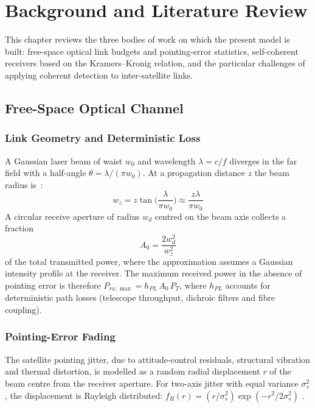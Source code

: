 \chapter{Background and Literature Review}

This chapter reviews the three bodies of work on which the present model is built: free-space optical link budgets and pointing-error statistics, self-coherent receivers based on the Kramers--Kronig relation, and the particular challenges of applying coherent detection to inter-satellite links.

\section{Free-Space Optical Channel}

\subsection{Link Geometry and Deterministic Loss}

A Gaussian laser beam of waist $w_0$ and wavelength $\lambda=c/f$ diverges in the far field with a half-angle $\theta=\lambda/(\pi w_0)$. At a propagation distance $z$ the beam radius is~\cite{kaushal2017}:
\begin{equation}
w_z=z\tan\!\Big(\frac{\lambda}{\pi w_0}\Big)\approx\frac{z\lambda}{\pi w_0}
\end{equation}
A circular receive aperture of radius $w_d$ centred on the beam axis collects a fraction
\begin{equation}
A_0=\frac{2w_d^2}{w_z^2}
\end{equation}
of the total transmitted power, where the approximation assumes a Gaussian intensity profile at the receiver. The maximum received power in the absence of pointing error is therefore $P_{rx,\max}=h_{PL}\,A_0\,P_T$, where $h_{PL}$ accounts for deterministic path losses (telescope throughput, dichroic filters and fibre coupling).

\subsection{Pointing-Error Fading}

The satellite pointing jitter, due to attitude-control residuals, structural vibration and thermal distortion, is modelled as a random radial displacement $r$ of the beam centre from the receiver aperture. For two-axis jitter with equal variance $\sigma_s^2$, the displacement is Rayleigh distributed: $f_R(r)=(r/\sigma_s^2)\exp(-r^2/2\sigma_s^2)$ \cite{shang2025}.

